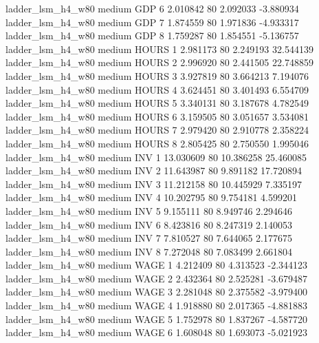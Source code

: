   ladder_lsm_h4_w80     medium      GDP                 6  2.010842 80       2.092033          -3.880934
  ladder_lsm_h4_w80     medium      GDP                 7  1.874559 80       1.971836          -4.933317
  ladder_lsm_h4_w80     medium      GDP                 8  1.759287 80       1.854551          -5.136757
  ladder_lsm_h4_w80     medium    HOURS                 1  2.981173 80       2.249193          32.544139
  ladder_lsm_h4_w80     medium    HOURS                 2  2.996920 80       2.441505          22.748859
  ladder_lsm_h4_w80     medium    HOURS                 3  3.927819 80       3.664213           7.194076
  ladder_lsm_h4_w80     medium    HOURS                 4  3.624451 80       3.401493           6.554709
  ladder_lsm_h4_w80     medium    HOURS                 5  3.340131 80       3.187678           4.782549
  ladder_lsm_h4_w80     medium    HOURS                 6  3.159505 80       3.051657           3.534081
  ladder_lsm_h4_w80     medium    HOURS                 7  2.979420 80       2.910778           2.358224
  ladder_lsm_h4_w80     medium    HOURS                 8  2.805425 80       2.750550           1.995046
  ladder_lsm_h4_w80     medium      INV                 1 13.030609 80      10.386258          25.460085
  ladder_lsm_h4_w80     medium      INV                 2 11.643987 80       9.891182          17.720894
  ladder_lsm_h4_w80     medium      INV                 3 11.212158 80      10.445929           7.335197
  ladder_lsm_h4_w80     medium      INV                 4 10.202795 80       9.754181           4.599201
  ladder_lsm_h4_w80     medium      INV                 5  9.155111 80       8.949746           2.294646
  ladder_lsm_h4_w80     medium      INV                 6  8.423816 80       8.247319           2.140053
  ladder_lsm_h4_w80     medium      INV                 7  7.810527 80       7.644065           2.177675
  ladder_lsm_h4_w80     medium      INV                 8  7.272048 80       7.083499           2.661804
  ladder_lsm_h4_w80     medium     WAGE                 1  4.212409 80       4.313523          -2.344123
  ladder_lsm_h4_w80     medium     WAGE                 2  2.432364 80       2.525281          -3.679487
  ladder_lsm_h4_w80     medium     WAGE                 3  2.281048 80       2.375582          -3.979400
  ladder_lsm_h4_w80     medium     WAGE                 4  1.918880 80       2.017365          -4.881883
  ladder_lsm_h4_w80     medium     WAGE                 5  1.752978 80       1.837267          -4.587720
  ladder_lsm_h4_w80     medium     WAGE                 6  1.608048 80       1.693073          -5.021923

